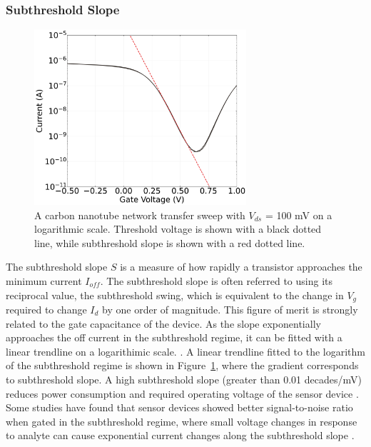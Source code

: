 \documentclass[
  a4paper,
]{scrbook}
\begin{document}
\hypertarget{subthreshold-slope}{%
\subsubsection*{Subthreshold Slope}\label{subthreshold-slope}}

\begin{figure}

{\centering \includegraphics[width=0.7\textwidth,height=\textheight]{figures/ch2/NTQ31C5ch1subthreshold_slope.png}

}

\caption{\label{fig-subthreshold-slope}A carbon nanotube network
transfer sweep with \(V_{ds}\) = 100 mV on a logarithmic scale.
Threshold voltage is shown with a black dotted line, while subthreshold
slope is shown with a red dotted line.}

\end{figure}

The subthreshold slope \(S\) is a measure of how rapidly a transistor
approaches the minimum current \(I_{off}\). The subthreshold slope is
often referred to using its reciprocal value, the subthreshold swing,
which is equivalent to the change in \(V_g\) required to change \(I_d\)
by one order of magnitude. This figure of merit is strongly related to
the gate capacitance of the device. As the slope exponentially
approaches the off current in the subthreshold regime, it can be fitted
with a linear trendline on a logarithimic scale.
\autocite{Sze2006,Petti2016}. A linear trendline fitted to the logarithm
of the subthreshold regime is shown in
Figure~\ref{fig-subthreshold-slope}, where the gradient corresponds to
subthreshold slope. A high subthreshold slope (greater than 0.01
decades/mV) reduces power consumption and required operating voltage of
the sensor device \autocite{Petti2016}. Some studies have found that
sensor devices showed better signal-to-noise ratio when gated in the
subthreshold regime, where small voltage changes in response to analyte
can cause exponential current changes along the subthreshold slope
\autocite{Heller2009,Gao2010}.
\end{document}

